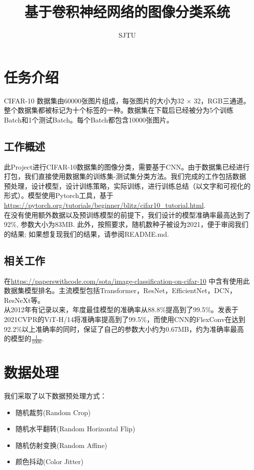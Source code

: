 \documentclass[UTF8,12pt]{article} %
\theoremstyle{definition}
\begin{document}
\title{基于卷积神经网络的图像分类系统}
\author{SJTU}
\maketitle

\section{任务介绍}
CIFAR-10 数据集由60000张图片组成，每张图片的大小为32 $\times$ 32，RGB三通道。整个数据集都被标记为十个标签的一种。数据集在下载后已经被分为5个训练Batch和1个测试Batch。每个Batch都包含10000张图片。\cite{krizhevsky2009learning}

\subsection{工作概述}
此Project进行CIFAR-10数据集的图像分类，需要基于CNN。由于数据集已经进行打包，我们直接使用数据集的训练集-测试集分类方法。我们完成的工作包括数据预处理，设计模型，设计训练策略，实际训练，进行训练总结（以文字和可视化的形式）。模型使用Pytorch工具，基于\url{https://pytorch.org/tutorials/beginner/blitz/cifar10_tutorial.html}. \\
\indent
在没有使用额外数据以及预训练模型的前提下，我们设计的模型准确率最高达到了92\%, 参数大小为83MB. 此外，按照要求，随机数种子被设为2021，便于审阅我们的结果; 如果想复现我们的结果，请参阅README.md.

\subsection {相关工作}
在\url{https://paperswithcode.com/sota/image-classification-on-cifar-10} 中含有使用此数据集模型排名。主流模型包括Transformer\cite{dosovitskiy2021image}，ResNet\cite{kolesnikov2020big}，EfficientNet\cite{tan2021efficientnetv2}，DCN\cite{sousa2021cnn}，ResNeXt\cite{Li_2019_CVPR}等。\\
\indent 从2012年有记录以来，年度最佳模型的准确率从88.8\%提高到了99.5\%。发表于2021CVPR的ViT-H/14将准确率提高到了99.5\%\cite{dosovitskiy2021image}，而使用CNN的FlexConv在达到92.2\%以上准确率的同时\cite{romero2021flexconv}，保证了自己的参数大小约为0.67MB，约为准确率最高的模型的$\frac{1}{1000}$.


\section{数据处理}
我们采取了以下数据预处理方式：
\begin{itemize}
\item 随机裁剪(Random Crop)
\item 随机水平翻转(Random Horizontal Flip)
\item 随机仿射变换(Random Affine)
\item 颜色抖动(Color Jitter)
\end{itemize}
\end{document}
